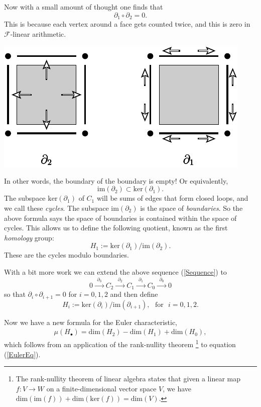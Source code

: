 \documentclass[11pt,oneside]{report}
\newcommand{\danbrowne}[1]{\ \textcolor{red}{\{#1\}}\ }
\newcommand{\Eref}[1]{(\ref{#1})}
\newcommand{\Field}{\mathcal{F}}
\def\Im{\mathrm{im}}
\def\Ker{\mathrm{ker}}
\def\Dim{\mathrm{dim}}
\def\euler{\mu}
\begin{document}
Now with a small amount of thought one finds that 
$$
    \partial_1 \circ \partial_2 = 0.
$$
This is because each vertex around a face gets counted twice,
and this is zero in $\Field$-linear arithmetic.
\begin{center}
\includegraphics{pic-bdy.pdf}
\end{center}
In other words, the boundary of the boundary is empty!
Or equivalently,
$$
    \Im(\partial_2) \subset \Ker(\partial_1).
$$
The subspace $\Ker(\partial_1)$ of $C_1$
will be sums of edges that form closed loops, and we
call these \emph{cycles}.
The subspace $\Im(\partial_2)$ is the space of \emph{boundaries}.
So the above formula
says the space of boundaries is contained within the space of cycles.
This allows us to define the following quotient,
known as the first \emph{homology} group:
$$
    H_1 := \Ker(\partial_1) / \Im(\partial_2).
$$
These are the cycles modulo boundaries.

With a bit more work we can extend the above sequence \Eref{Sequence} to
$$
  0 \xrightarrow{\ \ \partial_3\ \ } 
    C_2 \xrightarrow{\ \ \partial_2\ \ } 
    C_1 \xrightarrow{\ \ \partial_1\ \ } 
    C_0 \xrightarrow{\ \ \partial_0\ \ } 0
$$
so that $\partial_i \circ \partial_{i+1}=0$ 
for $i=0,1,2$
and then define
$$
    H_i := \Ker(\partial_i) / \Im(\partial_{i+1}),\ \ \ \mbox{for}\ \ \ i=0,1,2.
$$

Now we have a new formula for the Euler characteristic,
\begin{align}\label{EulerHom}
    \euler(H_{\bullet}) = \mbox{dim}(H_2) - \mbox{dim}(H_1) + \mbox{dim}(H_0),
\end{align}
which follows from
an application of the rank-nullity theorem
\footnote{The rank-nullity theorem of linear algebra
states that
given a linear map $f:V\to W$ on a finite-dimensional
vector space $V$,
we have $\Dim(\Im(f)) + \Dim(\Ker(f)) = \Dim(V).$}
to equation \Eref{EulerEq}.
\end{document}
